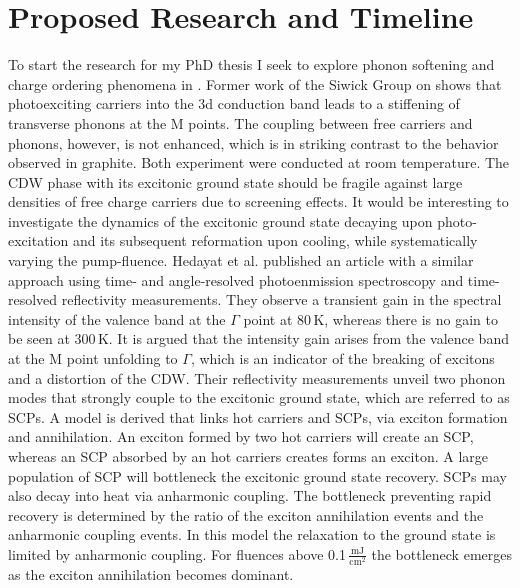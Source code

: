\section{Proposed Research and Timeline}
To start the research for my PhD thesis I seek to explore phonon softening and charge ordering phenomena in \ts.
Former work of the Siwick Group on \ts\space shows that photoexciting carriers into the 3d conduction band leads to a stiffening of transverse phonons at the M points\cite{otto2021}.
The coupling between free carriers and phonons, however, is not enhanced, which is in striking contrast to the behavior observed in graphite\cite{stern2018}.
Both experiment were conducted at room temperature.
The \ac{CDW} phase with its excitonic ground state should be fragile against large densities of free charge carriers due to screening effects.
It would be interesting to investigate the dynamics of the excitonic ground state decaying upon photo-excitation and its subsequent reformation upon cooling, while systematically varying the pump-fluence.
Hedayat et al. published an article with a similar approach using time- and angle-resolved photoenmission spectroscopy and time-resolved reflectivity measurements\cite{hedayat2019}.
They observe a transient gain in the spectral intensity of the valence band at the $\Gamma$ point at 80\,K, whereas there is no gain to be seen at 300\,K.
It is argued that the intensity gain arises from the valence band at the M point unfolding to $\Gamma$, which is an indicator of the breaking of excitons and a distortion of the \ac{CDW}.
Their reflectivity measurements unveil two phonon modes that strongly couple to the excitonic ground state, which are referred to as \acp{SCP}.
A model is derived that links hot carriers and \acp{SCP}, via exciton formation and annihilation.
An exciton formed by two hot carriers will create an \ac{SCP}, whereas an \ac{SCP} absorbed by an hot carriers creates forms an exciton.
A large population of \ac{SCP} will bottleneck the excitonic ground state recovery.
\Acp{SCP} may also decay into heat via anharmonic coupling.
The bottleneck preventing rapid recovery is determined by the ratio of the exciton annihilation events and the anharmonic coupling events.
In this model the relaxation to the ground state is limited by anharmonic coupling.
For fluences above 0.1\,$\frac{\mathrm{mJ}}{\mathrm{cm^2}}$ the bottleneck emerges as the exciton annihilation becomes dominant.

